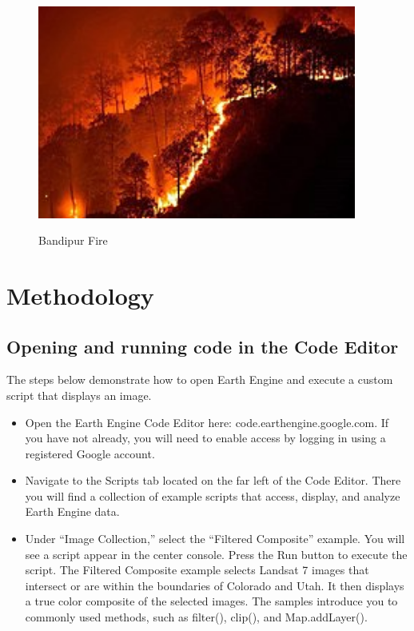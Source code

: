 \documentclass[12pt]{svproc}
\begin{document}
\begin{figure}{}
	\includegraphics[width=0.7\linewidth, height=7cm]{p3.jpg} 
	\label{fig:subim1}
	\centering
	\caption{Bandipur Fire}
\end{figure}



\section{Methodology}
%
\subsection{Opening and running code in the Code Editor}
The steps below demonstrate how to open Earth Engine and execute a custom script that displays an image.

\begin{itemize}
	\item Open the Earth Engine Code Editor here: code.earthengine.google.com. If you have not already, you will need to enable access by logging in using a registered Google account.\\
	\item Navigate to the Scripts tab located on the far left of the Code Editor. There you will find a collection of example scripts that access, display, and analyze Earth Engine data.\\
	\item Under “Image Collection,” select the “Filtered Composite” example. You will see a script appear in the center console. Press the Run button to execute the script. The Filtered Composite example selects Landsat 7 images that intersect or are within the boundaries of Colorado and Utah. It then displays a true color composite of the selected images. The samples introduce you to commonly used methods, such as filter(), clip(), and Map.addLayer().
\end{itemize}
\end{document}

